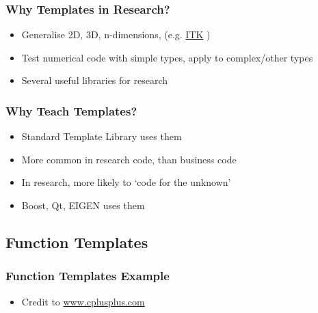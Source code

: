 \subsubsection{Why Templates in
Research?}\label{why-templates-in-research}

\begin{itemize}
\itemsep1pt\parskip0pt
\item
  Generalise 2D, 3D, n-dimensions, (e.g. \href{http://www.itk.org}{ITK}
  )
\item
  Test numerical code with simple types, apply to complex/other types
\item
  Several useful libraries for research
\end{itemize}

\subsubsection{Why Teach Templates?}\label{why-teach-templates}

\begin{itemize}
\itemsep1pt\parskip0pt
\item
  Standard Template Library uses them
\item
  More common in research code, than business code
\item
  In research, more likely to `code for the unknown'
\item
  Boost, Qt, EIGEN uses them
\end{itemize}

\subsection{Function Templates}\label{function-templates}

\subsubsection{Function Templates
Example}\label{function-templates-example}

\begin{itemize}
\itemsep1pt\parskip0pt
\item
  Credit to
  \href{http://www.cplusplus.com/doc/tutorial/functions2}{www.cplusplus.com}
\end{itemize}

